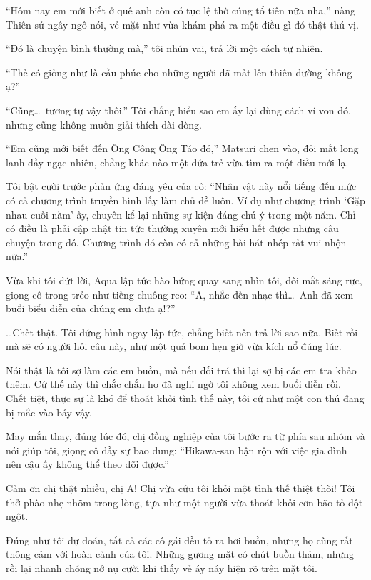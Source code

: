 \documentclass[../main.tex]{subfiles}
\begin{document}
``Hôm nay em mới biết ở quê anh còn có tục lệ thờ cúng tổ tiên nữa nha,'' nàng Thiên sứ ngây ngô nói, vẻ mặt như vừa khám phá ra một điều gì đó thật thú vị.

``Đó là chuyện bình thường mà,'' tôi nhún vai, trả lời một cách tự nhiên.

``Thế có giống như là cầu phúc cho những người đã mất lên thiên đường không ạ?''

``Cũng\dots\ tương tự vậy thôi.'' Tôi chẳng hiểu sao em ấy lại dùng cách ví von đó, nhưng cũng không muốn giải thích dài dòng.

``Em cũng mới biết đến Ông Công Ông Táo đó,'' Matsuri chen vào, đôi mắt long lanh đầy ngạc nhiên, chẳng khác nào một đứa trẻ vừa tìm ra một điều mới lạ.

Tôi bật cười trước phản ứng đáng yêu của cô: ``Nhân vật này nổi tiếng đến mức có cả chương trình truyền hình lấy làm chủ đề luôn. Ví dụ như chương trình `Gặp nhau cuối năm' ấy, chuyên kể lại những sự kiện đáng chú ý trong một năm. Chỉ có điều là phải cập nhật tin tức thường xuyên mới hiểu hết được những câu chuyện trong đó. Chương trình đó còn có cả những bài hát nhép rất vui nhộn nữa.''

Vừa khi tôi dứt lời, Aqua lập tức hào hứng quay sang nhìn tôi, đôi mắt sáng rực, giọng cô trong trẻo như tiếng chuông reo: ``A, nhắc đến nhạc thì\dots\ Anh đã xem buổi biểu diễn của chúng em chưa ạ!?''

\dots Chết thật. Tôi đứng hình ngay lập tức, chẳng biết nên trả lời sao nữa. Biết rồi mà sẽ có người hỏi câu này, như một quả bom hẹn giờ vừa kích nổ đúng lúc.

Nói thật là tôi sợ làm các em buồn, mà nếu dối trá thì lại sợ bị các em tra khảo thêm. Cứ thế này thì chắc chắn họ đã nghi ngờ tôi không xem buổi diễn rồi. Chết tiệt, thực sự là khó để thoát khỏi tình thế này, tôi cứ như một con thú đang bị mắc vào bẫy vậy.

May mắn thay, đúng lúc đó, chị đồng nghiệp của tôi bước ra từ phía sau nhóm và nói giúp tôi, giọng cô đầy sự bao dung: ``Hikawa-san bận rộn với việc gia đình nên cậu ấy không thể theo dõi được.''

Cảm ơn chị thật nhiều, chị A! Chị vừa cứu tôi khỏi một tình thế thiệt thòi! Tôi thở phào nhẹ nhõm trong lòng, tựa như một người vừa thoát khỏi cơn bão tố đột ngột.

Đúng như tôi dự đoán, tất cả các cô gái đều tỏ ra hơi buồn, nhưng họ cũng rất thông cảm với hoàn cảnh của tôi. Những gương mặt có chút buồn thảm, nhưng rồi lại nhanh chóng nở nụ cười khi thấy vẻ áy náy hiện rõ trên mặt tôi.
\end{document}

